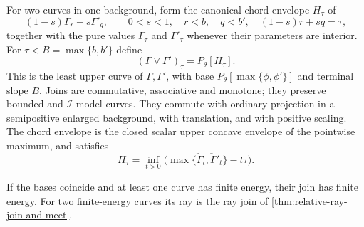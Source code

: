 \begin{theorem}\label{thm:test-curve-join}
For two curves in one background, form the canonical chord envelope $H_\tau$ of
\[
 (1-s)\Gamma_r+s\Gamma'_q,\qquad
 0<s<1,\quad r<b,\quad q<b',\quad (1-s)r+sq=\tau,
\]
together with the pure values $\Gamma_\tau$ and $\Gamma'_\tau$ whenever their parameters are interior. For $\tau< B=\max\{b,b'\}$ define
\[
 (\Gamma\vee\Gamma')_\tau=P_\theta[H_\tau].
\]
This is the least upper curve of $\Gamma,\Gamma'$, with base
$P_\theta[\max\{\phi,\phi'\}]$ and terminal slope $B$. Joins are commutative, associative and monotone; they preserve bounded and $\mathcal I$-model curves. They commute with ordinary projection in a semipositive enlarged background, with translation, and with positive scaling.
The chord envelope is the closed scalar upper concave envelope of the pointwise maximum, and satisfies
\[
 H_\tau=\inf_{t>0}
           \bigl(\max\{\check\Gamma_t,\check\Gamma'_t\}-t\tau\bigr).
\]

If the bases coincide and at least one curve has finite energy, their join has finite energy. For two finite-energy curves its ray is the ray join of \cref{thm:relative-ray-join-and-meet}.
\end{theorem}
